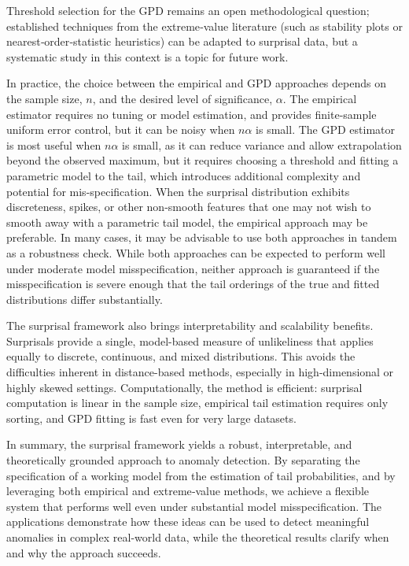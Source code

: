 \documentclass[
  12pt]{article}
\theoremstyle{definition}
\theoremstyle{plain}
\theoremstyle{plain}
\theoremstyle{plain}
\theoremstyle{remark}
\begin{document}
Threshold selection for the GPD remains an open methodological question;
established techniques from the extreme‑value literature (such as
stability plots or nearest‑order‑statistic heuristics) can be adapted to
surprisal data, but a systematic study in this context is a topic for
future work.

In practice, the choice between the empirical and GPD approaches depends
on the sample size, \(n\), and the desired level of significance,
\(\alpha\). The empirical estimator requires no tuning or model
estimation, and provides finite-sample uniform error control, but it can
be noisy when \(n\alpha\) is small. The GPD estimator is most useful
when \(n\alpha\) is small, as it can reduce variance and allow
extrapolation beyond the observed maximum, but it requires choosing a
threshold and fitting a parametric model to the tail, which introduces
additional complexity and potential for mis-specification. When the
surprisal distribution exhibits discreteness, spikes, or other
non-smooth features that one may not wish to smooth away with a
parametric tail model, the empirical approach may be preferable. In many
cases, it may be advisable to use both approaches in tandem as a
robustness check. While both approaches can be expected to perform well
under moderate model misspecification, neither approach is guaranteed if
the misspecification is severe enough that the tail orderings of the
true and fitted distributions differ substantially.

The surprisal framework also brings interpretability and scalability
benefits. Surprisals provide a single, model-based measure of
unlikeliness that applies equally to discrete, continuous, and mixed
distributions. This avoids the difficulties inherent in distance-based
methods, especially in high-dimensional or highly skewed settings.
Computationally, the method is efficient: surprisal computation is
linear in the sample size, empirical tail estimation requires only
sorting, and GPD fitting is fast even for very large datasets.

In summary, the surprisal framework yields a robust, interpretable, and
theoretically grounded approach to anomaly detection. By separating the
specification of a working model from the estimation of tail
probabilities, and by leveraging both empirical and extreme‑value
methods, we achieve a flexible system that performs well even under
substantial model misspecification. The applications demonstrate how
these ideas can be used to detect meaningful anomalies in complex
real-world data, while the theoretical results clarify when and why the
approach succeeds.
\end{document}
